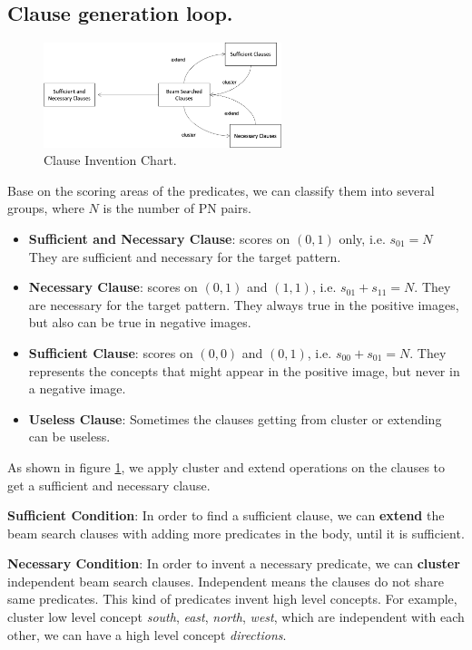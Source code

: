 \documentclass[
]{ceurart}
\begin{document}
\subsection{Clause generation loop.}

\begin{figure}[!htb]
	\centering
	\includegraphics[width=0.618\textwidth]{img/clause_invention_chart.png}
	\caption{Clause Invention Chart.}
	\label{fig:clause-invention-chart}
\end{figure}

Base on the scoring areas of the predicates, we can classify them into several groups, where $ N $ is the number of PN pairs.
\begin{itemize}
	\item \textbf{Sufficient and Necessary Clause}: scores on $ (0,1) $ only, i.e. $ s_{01} =N$ They are sufficient and necessary for the target pattern.
	\item \textbf{Necessary Clause}: scores on $ (0,1) $ and $ (1,1) $, i.e. $ s_{01} + s_{11} = N $. They are necessary for the target pattern. They always true in the positive images, but also can be true in negative images.
	\item \textbf{Sufficient Clause}: scores on $ (0,0) $ and $ (0,1) $, i.e. $ s_{00}+s_{01} = N $. They represents the concepts that might appear in the positive image, but never in a negative image.
	\item \textbf{Useless Clause}: Sometimes the clauses getting from cluster or extending can be useless.
\end{itemize}

As shown in figure \ref{fig:clause-invention-chart}, we apply cluster and extend operations on the clauses to get a sufficient and necessary clause.

\textbf{Sufficient Condition}: In order to find a sufficient clause, we can \textbf{extend} the beam search clauses with adding more predicates in the body, until it is sufficient.

\textbf{Necessary Condition}: In order to invent a necessary predicate, we can \textbf{cluster} independent beam search clauses. Independent means the clauses do not share same predicates. This kind of predicates invent high level concepts. For example, cluster low level concept \textit{south}, \textit{east}, \textit{north}, \textit{west}, which are independent with each other, we can have a high level concept \textit{directions}.
\end{document}
